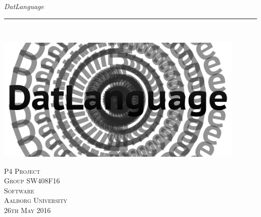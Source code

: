 \thispagestyle{empty}
\begin{flushright}
\vspace{3cm}

\phantom{hul}

\phantom{hul}

\phantom{hul}

\textsl{\Huge DatLanguage} \\ \vspace{1cm}

\rule{13cm}{3mm} \\ \vspace{1.5cm}
\vspace{1cm}

\includegraphics[width=0.9\textwidth]{billeder/DatLanguage}

\vspace{7cm} 
\textsc{\Large P4 Project \\
Group SW408F16 \\
Software\\
Aalborg University\\
26th May 2016\\}
\end{flushright}
